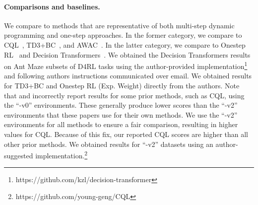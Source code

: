 \paragraph{Comparisons and baselines.} We compare to methods that are representative of both multi-step dynamic programming and one-step approaches. In the former category, we compare to CQL~\citep{kumar2020conservative}, TD3+BC~\citep{fujimoto2021minimalist}, and AWAC~\citep{nair2020awac}. In the latter category, we compare to Onestep RL~\citep{brandfonbrener2021offline} and Decision Transformers~\citep{chen2021decision}. We obtained the Decision Transformers results on Ant Maze subsets of D4RL tasks using the author-provided implementation\footnote{https://github.com/kzl/decision-transformer} and following authors instructions communicated over email. We obtained results for TD3+BC and Onestep RL (Exp. Weight) directly from the authors. Note that \citet{chen2021decision} and \citet{brandfonbrener2021offline}
incorrectly report results for some prior methods, such as CQL, using the ``-v0'' environments. These generally produce lower scores than the ``-v2'' environments that these papers use for their own methods. We use the ``-v2'' environments for all methods to ensure a fair comparison, resulting in higher values for CQL. Because of this fix, our reported CQL scores are higher than all other prior methods. We obtained results for ``-v2'' datasets using an author-suggested implementation.\footnote{https://github.com/young-geng/CQL}
